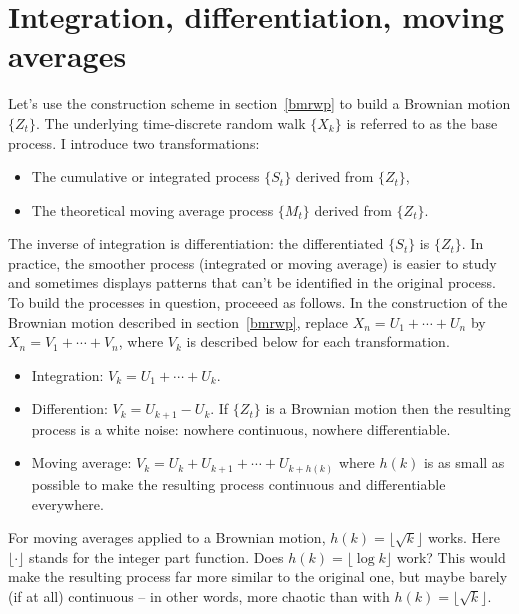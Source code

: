 \documentclass[oneside,10pt]{book}
\begin{document}
\section{Integration, differentiation, moving averages}\label{movbc}

Let's use the construction scheme in section~\ref{bmrwp} to build a Brownian motion $\{Z_t\}$.
The underlying time-discrete random walk $\{X_k\}$ is referred to as the base process. 
I introduce two transformations:\vspace{1ex}
\begin{itemize}
	\item The cumulative or \textcolor{index}{integrated process} $\{ S_t \}$ derived from $\{ Z_t \}$,
	\item The theoretical \textcolor{index}{moving average process} $\{ M_t \}$ derived from $\{ Z_t \}$.
\end{itemize}\vspace{1ex}
The inverse of integration is differentiation: the \textcolor{index}{differentiated} $\{S_t\}$ is $\{Z_t\}$. In practice, the smoother process (integrated or moving average) is easier to study and sometimes displays patterns that can't be identified in the original process. 
To build the processes in question, proceeed as follows.
In the construction of the Brownian motion described in section~\ref{bmrwp}, replace 
$X_n = U_1 + \cdots + U_n$ by 
$X_n = V_1 + \cdots + V_n$, where $V_k$ is described below for each transformation. \vspace{1ex}
\begin{itemize}
	\item Integration: $V_k = U_1 + \cdots + U_k$.
	\item Differention: $V_k = U_{k+1} - U_k$. If $\{ Z_t \}$ is a Brownian motion  then the resulting process is a white noise: nowhere continuous, nowhere differentiable.
	\item Moving average: $V_k = U_k + U_{k + 1} + \cdots + U_{k + h(k)}$ where $h(k)$ is as small as possible to make the resulting process continuous and differentiable everywhere.  
\end{itemize}\vspace{1ex}
For moving averages applied to a Brownian motion, $h(k) = \lfloor \sqrt{k}\rfloor$ works. Here $\lfloor \cdot \rfloor$ stands for the integer part function. Does $h(k) = \lfloor \log k \rfloor$ work? This would make the resulting process far more similar to the original one, but maybe barely (if at all) continuous -- in other words, more chaotic than with $h(k) =  \lfloor\sqrt{k} \rfloor$.
\end{document}
